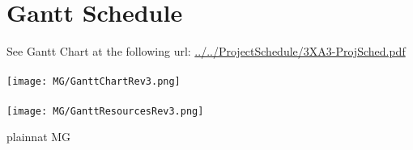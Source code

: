 \documentclass[12pt, titlepage]{article}
\begin{document}
\section{Gantt Schedule} \label{SeCSched}
See Gantt Chart at the following url: \url{../../ProjectSchedule/3XA3-ProjSched.pdf}\\
\\
\texttt{[image: MG/GanttChartRev3.png]}\\
\\
\texttt{[image: MG/GanttResourcesRev3.png]}



 {plainnat}
 {MG}
\end{document}
